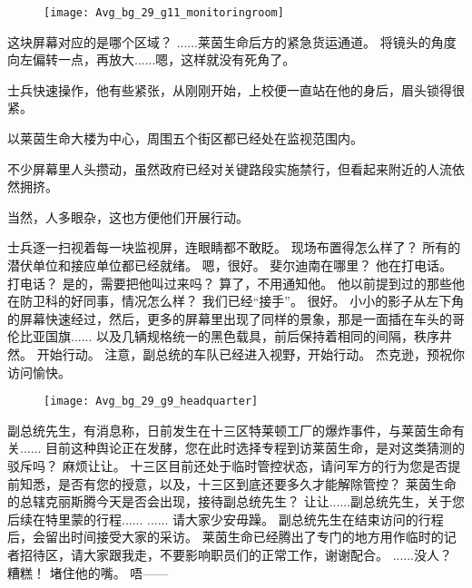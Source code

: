 \documentclass[openany]{book}
\begin{document}
\begin{figure}[h]
    \centering
    \texttt{[image: Avg\_bg\_29\_g11\_monitoringroom]}
\end{figure}
\begin{dialogue}
     这块屏幕对应的是哪个区域？
     ......莱茵生命后方的紧急货运通道。
     将镜头的角度向左偏转一点，再放大......嗯，这样就没有死角了。\par
    士兵快速操作，他有些紧张，从刚刚开始，上校便一直站在他的身后，眉头锁得很紧。\par
    以莱茵生命大楼为中心，周围五个街区都已经处在监视范围内。\par
    不少屏幕里人头攒动，虽然政府已经对关键路段实施禁行，但看起来附近的人流依然拥挤。\par
    当然，人多眼杂，这也方便他们开展行动。\par
    士兵逐一扫视着每一块监视屏，连眼睛都不敢眨。
     现场布置得怎么样了？
     所有的潜伏单位和接应单位都已经就绪。
     嗯，很好。
     斐尔迪南在哪里？
     他在打电话。
     打电话？
     是的，需要把他叫过来吗？
     算了，不用通知他。
     他以前提到过的那些他在防卫科的好同事，情况怎么样？
     我们已经“接手”。
     很好。
    小小的影子从左下角的屏幕快速经过，然后，更多的屏幕里出现了同样的景象，那是一面插在车头的哥伦比亚国旗......
    以及几辆规格统一的黑色载具，前后保持着相同的间隔，秩序井然。
     开始行动。
     注意，副总统的车队已经进入视野，开始行动。
     杰克逊，预祝你访问愉快。
\end{dialogue}

\begin{figure}[h]
    \centering
    \texttt{[image: Avg\_bg\_29\_g9\_headquarter]}
\end{figure}
\begin{dialogue}
     副总统先生，有消息称，日前发生在十三区特莱顿工厂的爆炸事件，与莱茵生命有关......
     目前这种舆论正在发酵，您在此时选择专程到访莱茵生命，是对这类猜测的驳斥吗？
     麻烦让让。
     十三区目前还处于临时管控状态，请问军方的行为您是否提前知悉，是否有您的授意，以及，十三区到底还要多久才能解除管控？
     莱茵生命的总辖克丽斯腾今天是否会出现，接待副总统先生？
     让让......副总统先生，关于您后续在特里蒙的行程......
     ......
     请大家少安毋躁。
     副总统先生在结束访问的行程后，会留出时间接受大家的采访。
     莱茵生命已经腾出了专门的地方用作临时的记者招待区，请大家跟我走，不要影响职员们的正常工作，谢谢配合。
     ......没人？
     糟糕！
     堵住他的嘴。
     唔——
\end{dialogue}
\end{document}
